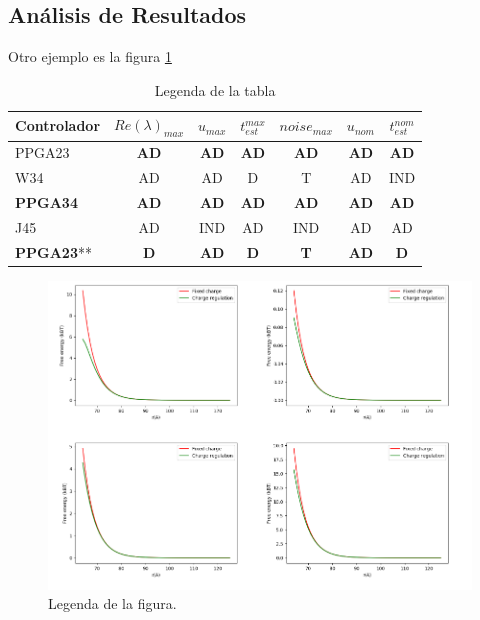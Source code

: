 \documentclass[twoside]{article} %
\begin{document}
\begin{multicols}{2}
\section{Análisis de Resultados}
Otro ejemplo es la figura \ref{fig:2}


\begin{table}[ht]
\centering
\caption{Legenda de la tabla }
\label{tabladeseables}
\begin{tabular}{lcccccc}   \hline
Controlador  & $Re(\lambda)_{max}$  & $u_{max}$ & $t_{est}^{max}$ & $noise_{max}$ & $u_{nom}$ & $t_{est}^{nom}$  \\ \hline
PPGA23 & \textbf{AD} & \textbf{AD}& \textbf{AD}&\textbf{AD} &\textbf{AD} & \textbf{AD}\\
 \hline
 W34 & AD & AD & D & T & AD & IND \\
 \textbf{PPGA34} & \textbf{AD} & \textbf{AD} & \textbf{AD} & \textbf{AD} & \textbf{AD} & \textbf{AD} \\
  \hline
J45 & AD & IND & AD & IND & AD & AD \\
\textbf{PPGA23}**& \textbf{D} & \textbf{AD} & \textbf{D} & \textbf{T} & \textbf{AD} & \textbf{D} \\
 \hline
\end{tabular}
\end{table}




\begin{figure}[H] 
\centering
\includegraphics[scale=0.4]{figurateste2.png} 
\caption{Legenda de la figura.} 
\label{fig:2} 
\end{figure}



\end{multicols}
\end{document}
